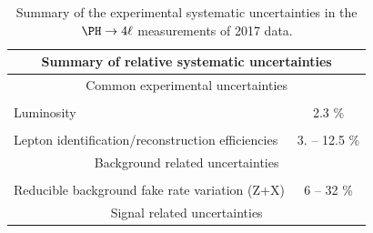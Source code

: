 \begin{table}[!htb]
\begin{center}
\small
\caption{
Summary of the experimental systematic uncertainties in the $\Hllll$ measurements of 2017 data. %
\label{tab:SystOverviewB}
}
\begin{tabular}{|lc|} 
\hline %
\hline %
\multicolumn{2}{|c|}{\textbf{Summary of relative systematic uncertainties}} \\
\hline %
\hline %
\multicolumn{2}{|c|}{Common experimental uncertainties} \\
\hline %
\vspace{-0.4cm} & \\
Luminosity & 2.3 \%  \\ 
\vspace{-0.4cm} & \\
Lepton identification/reconstruction efficiencies & 3. -- 12.5 \% \\ 
\hline %
\hline %
\multicolumn{2}{|c|}{Background related uncertainties} \\
\hline %
\vspace{-0.4cm} & \\
Reducible background fake rate variation (Z+X) & 6 -- 32 \% \\ 
\hline %
\hline %
\multicolumn{2}{|c|}{Signal related uncertainties} \\

\end{tabular}
\end{center}
\end{table}
